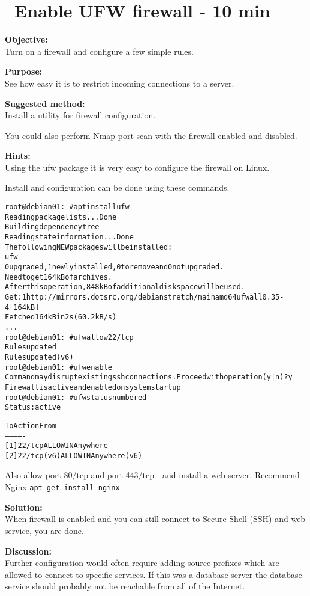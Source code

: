 \documentclass[a4paper,11pt,notitlepage]{report}
\begin{document}
\chapter{\faInfoCircle\ Enable UFW firewall - 10 min}
\label{ex:debian-firewall}

{\bf Objective:}\\
Turn on a firewall and configure a few simple rules.

{\bf Purpose:}\\
See how easy it is to restrict incoming connections to a server.


{\bf Suggested method:}\\
Install a utility for firewall configuration.

You could also perform Nmap port scan with the firewall enabled and disabled.

{\bf Hints:}\\
Using the ufw package it is very easy to configure the firewall on Linux.

Install and configuration can be done using these commands.
\begin{alltt}
root@debian01:~# apt install ufw
Reading package lists... Done
Building dependency tree
Reading state information... Done
The following NEW packages will be installed:
  ufw
0 upgraded, 1 newly installed, 0 to remove and 0 not upgraded.
Need to get 164 kB of archives.
After this operation, 848 kB of additional disk space will be used.
Get:1 http://mirrors.dotsrc.org/debian stretch/main amd64 ufw all 0.35-4 [164 kB]
Fetched 164 kB in 2s (60.2 kB/s)
...
root@debian01:~# ufw allow 22/tcp
Rules updated
Rules updated (v6)
root@debian01:~# ufw enable
Command may disrupt existing ssh connections. Proceed with operation (y|n)? y
Firewall is active and enabled on system startup
root@debian01:~# ufw status numbered
Status: active

     To                         Action      From
     --                         ------      ----
[ 1] 22/tcp                     ALLOW IN    Anywhere
[ 2] 22/tcp (v6)                ALLOW IN    Anywhere (v6)
\end{alltt}

Also allow port 80/tcp and port 443/tcp - and install a web server. Recommend Nginx \verb+apt-get install nginx+

{\bf Solution:}\\
When firewall is enabled and you can still connect to Secure Shell (SSH) and web service, you are done.

{\bf Discussion:}\\
Further configuration would often require adding source prefixes which are allowed to connect to specific services. If this was a database server the database service should probably not be reachable from all of the Internet.
\end{document}
